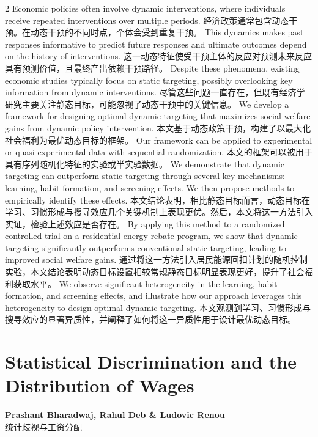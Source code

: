 \documentclass[cn,hazy,blue,14pt,screen]{elegantnote}
\begin{document}
\begin{paracol}{2}
	Economic policies often involve dynamic interventions, where individuals receive repeated interventions over multiple periods. 
	\switchcolumn
	经济政策通常包含动态干预。在动态干预的不同时点，个体会受到重复干预。
	\switchcolumn*
	This dynamics makes past responses informative to predict future responses and ultimate outcomes depend on the history of interventions. 
	\switchcolumn
	这一动态特征使受干预主体的反应对预测未来反应具有预测价值，且最终产出依赖干预路径。
	\switchcolumn*
	Despite these phenomena, existing economic studies typically focus on static targeting, possibly overlooking key information from dynamic interventions. 
	\switchcolumn
	尽管这些问题一直存在，但既有经济学研究主要关注静态目标，可能忽视了动态干预中的关键信息。
	\switchcolumn*
	We develop a framework for designing optimal dynamic targeting that maximizes social welfare gains from dynamic policy intervention. 
	\switchcolumn
	本文基于动态政策干预，构建了以最大化社会福利为最优动态目标的框架。
	\switchcolumn*
	Our framework can be applied to experimental or quasi-experimental data with sequential randomization. 
	\switchcolumn
	本文的框架可以被用于具有序列随机化特征的实验或半实验数据。
	\switchcolumn*
	We demonstrate that dynamic targeting can outperform static targeting through several key mechanisms: learning, habit formation, and screening effects. We then propose methods to empirically identify these effects. 
	\switchcolumn
	本文结论表明，相比静态目标而言，动态目标在学习、习惯形成与搜寻效应几个关键机制上表现更优。然后，本文将这一方法引入实证，检验上述效应是否存在。
	\switchcolumn*
	By applying this method to a randomized controlled trial on a residential energy rebate program, we show that dynamic targeting significantly outperforms conventional static targeting, leading to improved social welfare gains. 
	\switchcolumn
	通过将这一方法引入居民能源回扣计划的随机控制实验，本文结论表明动态目标设置相较常规静态目标明显表现更好，提升了社会福利获取水平。
	\switchcolumn*
	We observe significant heterogeneity in the learning, habit formation, and screening effects, and illustrate how our approach leverages this heterogeneity to design optimal dynamic targeting.
	\switchcolumn
	本文观测到学习、习惯形成与搜寻效应的显著异质性，并阐释了如何将这一异质性用于设计最优动态目标。
	
\end{paracol}

\section{Statistical Discrimination and the Distribution of Wages}
\begin{center}
	\textbf{Prashant Bharadwaj, Rahul Deb \& Ludovic Renou}\\
	统计歧视与工资分配
\end{center}
\end{document}
